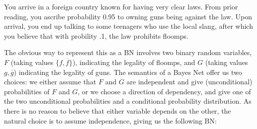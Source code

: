 \documentclass{article}
\theoremstyle{plain}
\theoremstyle{definition}
\newenvironment{example}
	{\pushQED{\qed}\renewcommand{\qedsymbol}{$\triangle$}\examplex}
	{\popQED\endexamplex%
}
\theoremstyle{remark}
\numberwithin{equation}{section}
\begin{document}
\begin{example}
		\label{ex:guns-and-floomps}
You arrive in a foreign country known for having very clear laws. From
prior reading, you ascribe probability 0.95 to owning guns being
against the law. Upon arrival, you end up talking to some teenagers
who use the local slang, after which you believe that with probility
.1, the law prohibits floomps.  
		
		The obvious way to represent this as a BN involves two
                binary random variables, $F$ (taking values $\{f,
                \overline f\}$), indicating the legality of floomps,
                and $G$ (taking values $g, \overline g$) indicating
                the legality of guns. The semantics of a Bayes Net
                offer us two choices: we either assume that $F$ and
                $G$ are independent and give (unconditional)
                probabilities of $F$ and $G$, or we choose a direction
                of dependency, 
   and give one of the two unconditional probabilities and a conditional probability distribution. As there is no reason to believe that either variable depends on the other, the natural choice is to assume independence, giving us the following BN:
		
		
		\begin{center}
		\end{center}
		

\end{example}
\end{document}
